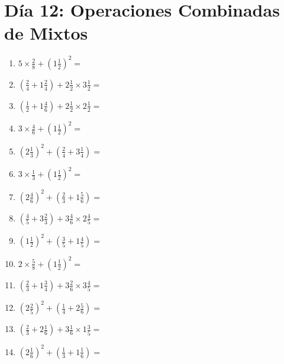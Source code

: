 \documentclass[12pt]{article}
\begin{document}
\section*{Día 12: Operaciones Combinadas de Mixtos}
\begin{enumerate}
\item \large $ 5 \times \frac{2}{8} + (1 \frac{1}{2})^2 = $ \vspace{1.8cm}
\item \large $ (\frac{2}{4} + 1 \frac{2}{4}) + 2 \frac{1}{2} \times 3 \frac{1}{2} = $ \vspace{1.8cm}
\item \large $ (\frac{1}{2} + 1 \frac{4}{6}) + 2 \frac{1}{2} \times 2 \frac{1}{2} = $ \vspace{1.8cm}
\item \large $ 3 \times \frac{4}{6} + (1 \frac{1}{2})^2 = $ \vspace{1.8cm}
\item \large $ (2 \frac{1}{3})^2 + (\frac{2}{4} + 3 \frac{1}{4}) = $ \vspace{1.8cm}
\item \large $ 3 \times \frac{1}{3} + (1 \frac{1}{2})^2 = $ \vspace{1.8cm}
\item \large $ (2 \frac{4}{6})^2 + (\frac{2}{3} + 1 \frac{5}{6}) = $ \vspace{1.8cm}
\item \large $ (\frac{4}{5} + 3 \frac{2}{3}) + 3 \frac{4}{6} \times 2 \frac{4}{5} = $ \vspace{1.8cm}
\item \large $ (1 \frac{1}{2})^2 + (\frac{3}{5} + 1 \frac{4}{5}) = $ \vspace{1.8cm}
\item \large $ 2 \times \frac{5}{8} + (1 \frac{1}{2})^2 = $ \vspace{1.8cm}
\newpage
\item \large $ (\frac{2}{3} + 1 \frac{3}{4}) + 3 \frac{2}{6} \times 3 \frac{4}{5} = $ \vspace{1.8cm}
\item \large $ (2 \frac{2}{5})^2 + (\frac{1}{4} + 2 \frac{5}{6}) = $ \vspace{1.8cm}
\item \large $ (\frac{2}{3} + 2 \frac{1}{6}) + 3 \frac{1}{6} \times 1 \frac{3}{5} = $ \vspace{1.8cm}
\item \large $ (2 \frac{1}{6})^2 + (\frac{1}{3} + 1 \frac{1}{6}) = $ \vspace{1.8cm}

\end{enumerate}
\end{document}
